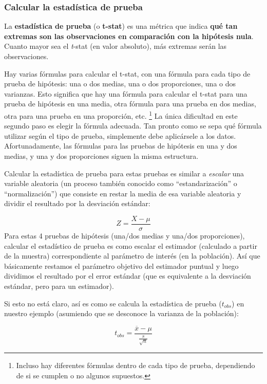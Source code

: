 \documentclass[
]{book}
\begin{document}
\hypertarget{calcular-la-estaduxedstica-de-prueba}{%
\subsubsection{Calcular la estadística de prueba}\label{calcular-la-estaduxedstica-de-prueba}}

La \textbf{estadística de prueba} (o \textbf{t-stat}) es una métrica que indica \textbf{qué tan extremas son las observaciones en comparación con la hipótesis nula}. Cuanto mayor sea el \emph{t}-stat (en valor absoluto), más extremas serán las observaciones.

Hay varias fórmulas para calcular el t-stat, con una fórmula para cada tipo de prueba de hipótesis: una o dos medias, una o dos proporciones, una o dos varianzas. Esto significa que hay una fórmula para calcular el t-stat para una prueba de hipótesis en una media, otra fórmula para una prueba en dos medias, otra para una prueba en una proporción, etc. \footnote{Incluso hay diferentes fórmulas dentro de cada tipo de prueba, dependiendo de si se cumplen o no algunos supuestos.} La única dificultad en este segundo paso es elegir la fórmula adecuada. Tan pronto como se sepa qué fórmula utilizar según el tipo de prueba, simplemente debe aplicársele a los datos. Afortunadamente, las fórmulas para las pruebas de hipótesis en una y dos medias, y una y dos proporciones siguen la misma estructura.

Calcular la estadística de prueba para estas pruebas es similar a \emph{escalar} una variable aleatoria (un proceso también conocido como ``estandarización'' o ``normalización'') que consiste en restar la media de esa variable aleatoria y dividir el resultado por la desviación estándar:

\[Z = \frac{X - \mu}{\sigma}\]
Para estas 4 pruebas de hipótesis (una/dos medias y una/dos proporciones), calcular el estadístico de prueba es como escalar el estimador (calculado a partir de la muestra) correspondiente al parámetro de interés (en la población). Así que básicamente restamos el parámetro objetivo del estimador puntual y luego dividimos el resultado por el error estándar (que es equivalente a la desviación estándar, pero para un estimador).

Si esto no está claro, así es como se calcula la estadística de prueba (\(t_{obs}\)) en nuestro ejemplo (asumiendo que se desconoce la varianza de la población):

\[t_{obs} = \frac{\overline{x} - \mu}{\frac{s}{\sqrt{n}}}\]
\end{document}
